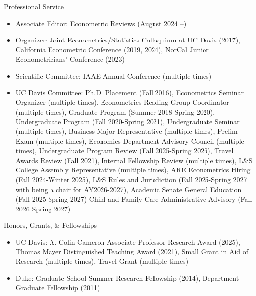 \documentclass{article}
\begin{document}
\bigskip\noindent Professional Service 
\begin{itemize}
\item[] Associate Editor: Econometric Reviews (August 2024 --)
\item[] Organizer: 
Joint Econometrics/Statistics Colloquium at UC Davis (2017), %
California Econometric Conference (2019, 2024), %
NorCal Junior Econometricians’ Conference (2023) %
\item[] Scientific Committee: 
IAAE Annual Conference  (multiple times) %
\item[] UC Davis Committee: 
Ph.D. Placement (Fall 2016), 
Econometrics Seminar Organizer (multiple times), 
Econometrics Reading Group Coordinator (multiple times), 
Graduate Program (Summer 2018-Spring 2020),
Undergraduate Program  (Fall 2020-Spring 2021),
Undergraduate Seminar (multiple times),
Business Major Representative (multiple times), 
Prelim Exam (multiple times), 
Economics Department Advisory Council (multiple times),
Undergraduate Program Review (Fall 2025-Spring 2026),
Travel Awards Review  (Fall 2021),
Internal Fellowship Review  (multiple times),
L\&S College Assembly Representative (multiple times), 
ARE Econometrics Hiring (Fall 2024-Winter 2025), 
L\&S Rules and Jurisdiction (Fall 2025-Spring 2027 with being a chair for AY2026-2027),  
Academic Senate General Education (Fall 2025-Spring 2027)
Child and Family Care Administrative Advisory (Fall 2026-Spring 2027)
\end{itemize}
\bigskip\noindent Honors, Grants, \& Fellowships 
\begin{itemize}
\item[] UC Davis: A. Colin Cameron Associate Professor Research Award (2025), Thomas Mayer Distinguished Teaching Award (2021), Small Grant in Aid of Research (multiple times), Travel Grant (multiple times)
\item[] Duke:  Graduate School Summer Research Fellowship (2014), Department Graduate Fellowship (2011)
\end{itemize}
\end{document}

